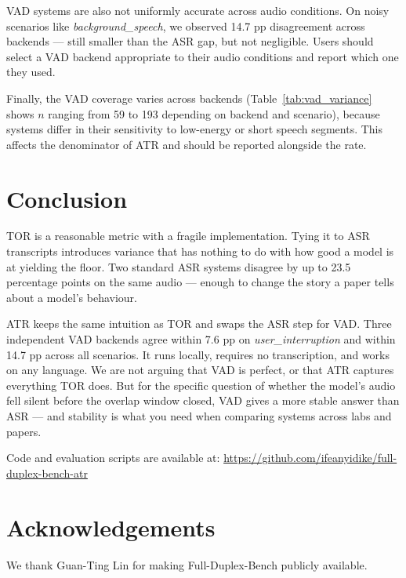 \documentclass[a4paper]{article}
\begin{document}
VAD systems are also not uniformly accurate across audio conditions. On noisy
scenarios like \emph{background\_speech}, we observed 14.7 pp disagreement
across backends --- still smaller than the ASR gap, but not negligible. Users
should select a VAD backend appropriate to their audio conditions and report
which one they used.

Finally, the VAD coverage varies across backends (Table~\ref{tab:vad_variance}
shows $n$ ranging from 59 to 193 depending on backend and scenario), because
systems differ in their sensitivity to low-energy or short speech segments.
This affects the denominator of ATR and should be reported alongside the rate.

\section{Conclusion}
\label{sec:conclusion}

TOR is a reasonable metric with a fragile implementation. Tying it to ASR
transcripts introduces variance that has nothing to do with how good a model
is at yielding the floor. Two standard ASR systems disagree by up to 23.5
percentage points on the same audio --- enough to change the story a paper
tells about a model's behaviour.

ATR keeps the same intuition as TOR and swaps the ASR step for VAD. Three
independent VAD backends agree within 7.6 pp on \emph{user\_interruption}
and within 14.7 pp across all scenarios. It runs locally, requires no
transcription, and works on any language. We are not arguing that VAD is
perfect, or that ATR captures everything TOR does. But for the specific
question of whether the model's audio fell silent before the overlap window
closed, VAD gives a more stable answer than ASR --- and stability is what
you need when comparing systems across labs and papers.

Code and evaluation scripts are available at:
\url{https://github.com/ifeanyidike/full-duplex-bench-atr}

\section{Acknowledgements}

We thank Guan-Ting Lin for making Full-Duplex-Bench publicly available.



\end{document}
